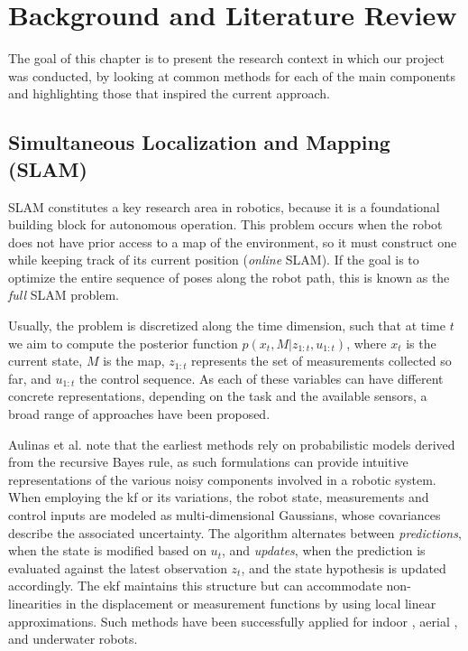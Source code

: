 \chapter{Background and Literature Review}
\label{ch:review}

The goal of this chapter is to present the research context in which our project was conducted, by looking at common methods for each of the main components and highlighting those that inspired the current approach.

\section{Simultaneous Localization and Mapping (SLAM)}

SLAM constitutes a key research area in robotics, because it is a foundational building block for autonomous operation. This problem occurs when the robot does not have prior access to a map of the environment, so it must construct one while keeping track of its current position (\emph{online} SLAM). If the goal is to optimize the entire sequence of poses along the robot path, this is known as the \emph{full} SLAM problem. \cite{thrun}

Usually, the problem is discretized along the time dimension, such that at time $t$ we aim to compute the posterior function $p(x_t, M|z_{1:t}, u_{1:t})$, where $x_t$ is the current state, $M$ is the map, $z_{1:t}$ represents the set of measurements collected so far, and $u_{1:t}$ the control sequence. As each of these variables can have different concrete representations, depending on the task and the available sensors, a broad range of approaches have been proposed.

Aulinas et al. \cite{aulinas2008slam} note that the earliest methods rely on probabilistic models derived from the recursive Bayes rule, as such formulations can provide intuitive representations of the various noisy components involved in a robotic system. When employing the \acrfull{kf} \cite{Kalman1960} or its variations, the robot state, measurements and control inputs are modeled as multi-dimensional Gaussians, whose covariances describe the associated uncertainty. The algorithm alternates between \emph{predictions}, when the state is modified based on $u_t$, and \emph{updates}, when the prediction is evaluated against the latest observation $z_t$, and the state hypothesis is updated accordingly. The \acrfull{ekf} maintains this structure but can accommodate non-linearities in the displacement or measurement functions by using local linear approximations. Such methods have been successfully applied for indoor \cite{davisonEKF}, aerial \cite{luo2013uav}, and underwater \cite{palomer2019inspection} robots.

